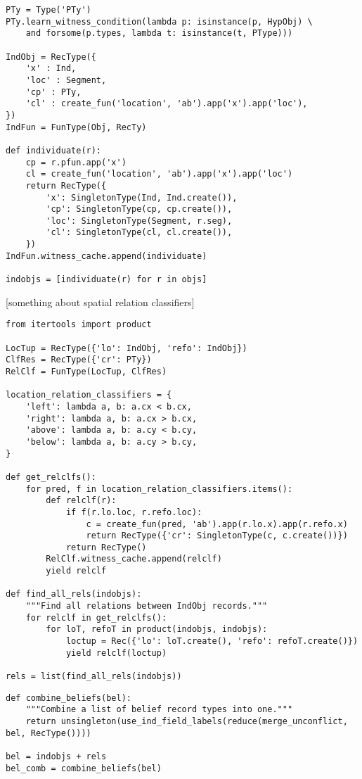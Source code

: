 \begin{lstlisting}[label={lst:individuate},caption={individuate()}]
PTy = Type('PTy')
PTy.learn_witness_condition(lambda p: isinstance(p, HypObj) \
    and forsome(p.types, lambda t: isinstance(t, PType)))

IndObj = RecType({
    'x' : Ind,
    'loc' : Segment,
    'cp' : PTy,
    'cl' : create_fun('location', 'ab').app('x').app('loc'),
})
IndFun = FunType(Obj, RecTy)

def individuate(r):
    cp = r.pfun.app('x')
    cl = create_fun('location', 'ab').app('x').app('loc')
    return RecType({
        'x': SingletonType(Ind, Ind.create()),
        'cp': SingletonType(cp, cp.create()),
        'loc': SingletonType(Segment, r.seg),
        'cl': SingletonType(cl, cl.create()),
    })
IndFun.witness_cache.append(individuate)

indobjs = [individuate(r) for r in objs]
\end{lstlisting}

[something about spatial relation classifiers]

\begin{lstlisting}[label=lst:relclf, caption=Spatial relation classifiers]
from itertools import product

LocTup = RecType({'lo': IndObj, 'refo': IndObj})
ClfRes = RecType({'cr': PTy})
RelClf = FunType(LocTup, ClfRes)

location_relation_classifiers = {
    'left': lambda a, b: a.cx < b.cx,
    'right': lambda a, b: a.cx > b.cx,
    'above': lambda a, b: a.cy < b.cy,
    'below': lambda a, b: a.cy > b.cy,
}

def get_relclfs():
    for pred, f in location_relation_classifiers.items():
        def relclf(r):
            if f(r.lo.loc, r.refo.loc):
                c = create_fun(pred, 'ab').app(r.lo.x).app(r.refo.x)
                return RecType({'cr': SingletonType(c, c.create())})
            return RecType()
        RelClf.witness_cache.append(relclf)
        yield relclf

def find_all_rels(indobjs):
    """Find all relations between IndObj records."""
    for relclf in get_relclfs():
        for loT, refoT in product(indobjs, indobjs):
            loctup = Rec({'lo': loT.create(), 'refo': refoT.create()})
            yield relclf(loctup)

rels = list(find_all_rels(indobjs))
\end{lstlisting}

\begin{lstlisting}[label=lst:bel, caption=Combining beliefs.]
def combine_beliefs(bel):
    """Combine a list of belief record types into one."""
    return unsingleton(use_ind_field_labels(reduce(merge_unconflict, bel, RecType())))

bel = indobjs + rels
bel_comb = combine_beliefs(bel)
\end{lstlisting}

